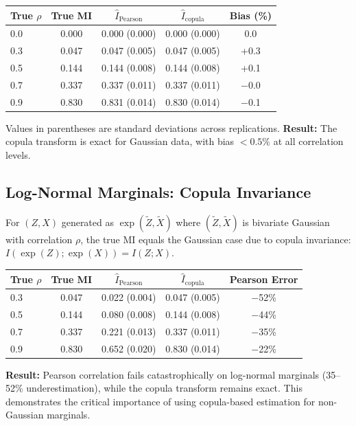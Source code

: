 \documentclass[10pt]{article} %
\theoremstyle{plain}
\theoremstyle{definition}
\newcommand{\MI}{I}
\begin{document}
\begin{center}
\begin{tabular}{lcccc}
\toprule
True $\rho$ & True MI & $\widehat{\MI}_{\text{Pearson}}$ & $\widehat{\MI}_{\text{copula}}$ & Bias (\%) \\
\midrule
0.0 & 0.000 & 0.000 (0.000) & 0.000 (0.000) & 0.0 \\
0.3 & 0.047 & 0.047 (0.005) & 0.047 (0.005) & +0.3 \\
0.5 & 0.144 & 0.144 (0.008) & 0.144 (0.008) & +0.1 \\
0.7 & 0.337 & 0.337 (0.011) & 0.337 (0.011) & $-$0.0 \\
0.9 & 0.830 & 0.831 (0.014) & 0.830 (0.014) & $-$0.1 \\
\bottomrule
\end{tabular}
\end{center}

\noindent Values in parentheses are standard deviations across replications. \textbf{Result:} The copula transform is exact for Gaussian data, with bias $< 0.5\%$ at all correlation levels.

\subsection{Log-Normal Marginals: Copula Invariance}

For $(Z, X)$ generated as $\exp(\tilde{Z}, \tilde{X})$ where $(\tilde{Z}, \tilde{X})$ is bivariate Gaussian with correlation $\rho$, the true MI equals the Gaussian case due to copula invariance: $\MI(\exp(Z); \exp(X)) = \MI(Z; X)$.

\begin{center}
\begin{tabular}{lcccc}
\toprule
True $\rho$ & True MI & $\widehat{\MI}_{\text{Pearson}}$ & $\widehat{\MI}_{\text{copula}}$ & Pearson Error \\
\midrule
0.3 & 0.047 & 0.022 (0.004) & 0.047 (0.005) & $-$52\% \\
0.5 & 0.144 & 0.080 (0.008) & 0.144 (0.008) & $-$44\% \\
0.7 & 0.337 & 0.221 (0.013) & 0.337 (0.011) & $-$35\% \\
0.9 & 0.830 & 0.652 (0.020) & 0.830 (0.014) & $-$22\% \\
\bottomrule
\end{tabular}
\end{center}

\textbf{Result:} Pearson correlation fails catastrophically on log-normal marginals (35--52\% underestimation), while the copula transform remains exact. This demonstrates the critical importance of using copula-based estimation for non-Gaussian marginals.
\end{document}
